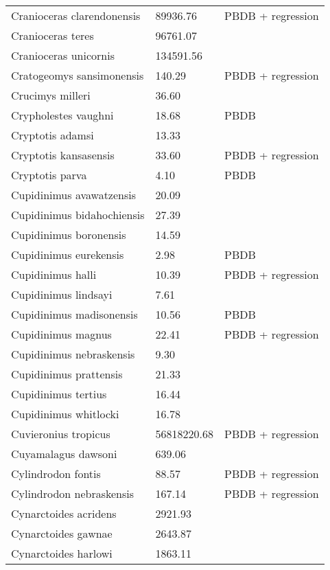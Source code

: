 \documentclass{article}
\begin{document}
\begin{center}
\begin{longtable}{p{} p{} p{} }
  Cranioceras clarendonensis & 89936.76 & PBDB + regression \\ 
  Cranioceras teres & 96761.07 & \cite{Tomiya2013} \\ 
  Cranioceras unicornis & 134591.56 & \cite{Tomiya2013} \\ 
  Cratogeomys sansimonensis & 140.29 & PBDB + regression \\ 
  Crucimys milleri & 36.60 & \cite{Tomiya2013} \\ 
  Crypholestes vaughni & 18.68 & PBDB \\ 
  Cryptotis adamsi & 13.33 & \cite{Tomiya2013} \\ 
  Cryptotis kansasensis & 33.60 & PBDB + regression \\ 
  Cryptotis parva & 4.10 & PBDB \\ 
  Cupidinimus avawatzensis & 20.09 & \cite{Tomiya2013} \\ 
  Cupidinimus bidahochiensis & 27.39 & \cite{Tomiya2013} \\ 
  Cupidinimus boronensis & 14.59 & \cite{Tomiya2013} \\ 
  Cupidinimus eurekensis & 2.98 & PBDB \\ 
  Cupidinimus halli & 10.39 & PBDB + regression \\ 
  Cupidinimus lindsayi & 7.61 & \cite{Tomiya2013} \\ 
  Cupidinimus madisonensis & 10.56 & PBDB \\ 
  Cupidinimus magnus & 22.41 & PBDB + regression \\ 
  Cupidinimus nebraskensis & 9.30 & \cite{Tomiya2013} \\ 
  Cupidinimus prattensis & 21.33 & \cite{Tomiya2013} \\ 
  Cupidinimus tertius & 16.44 & \cite{Tomiya2013} \\ 
  Cupidinimus whitlocki & 16.78 & \cite{Tomiya2013} \\ 
  Cuvieronius tropicus & 56818220.68 & PBDB + regression \\ 
  Cuyamalagus dawsoni & 639.06 & \cite{Tomiya2013} \\ 
  Cylindrodon fontis & 88.57 & PBDB + regression \\ 
  Cylindrodon nebraskensis & 167.14 & PBDB + regression \\ 
  Cynarctoides acridens & 2921.93 & \cite{Tomiya2013} \\ 
  Cynarctoides gawnae & 2643.87 & \cite{Tomiya2013} \\ 
  Cynarctoides harlowi & 1863.11 & \cite{Tomiya2013} \\ 

\end{longtable}
\end{center}
\end{document}

